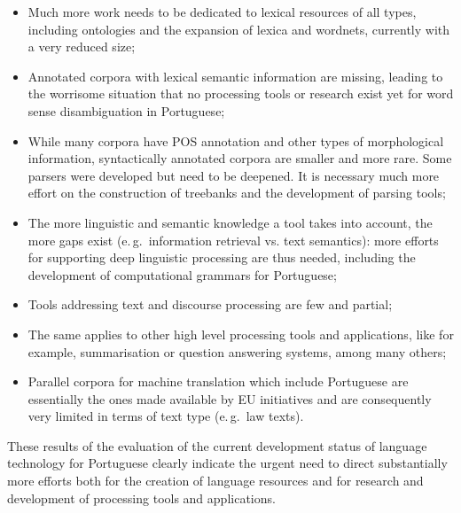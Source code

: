 \begin{multicols}{2}
\begin{itemize}
   \item Much more work needs to be dedicated to lexical resources of all types, including ontologies and the
expansion of lexica and wordnets, currently with a very reduced size;

    \item Annotated corpora with lexical semantic information are missing, leading to the worrisome situation that no processing tools or research exist yet for word sense disambiguation in Portuguese;

    \item While many corpora have POS annotation and other types of morphological information, 
syntactically annotated corpora are smaller and more rare. Some parsers were developed but need to be deepened.
It is necessary much more effort on the construction of treebanks and the development of
parsing tools;

   \item The more linguistic and semantic knowledge a tool takes into account, the more gaps exist (e.\,g.~information retrieval vs. text semantics): more efforts for supporting deep linguistic processing are thus needed, including the development of computational grammars for Portuguese;

   \item Tools addressing text and discourse processing are few and partial;

\item The same applies to other high level processing tools and applications, like for example, 
summarisation or question answering systems, among many others;

    \item Parallel corpora for machine translation which include Portuguese are essentially the ones made available by EU initiatives and are consequently very limited in terms of text type (e.\,g.~law texts).

    \end{itemize}

These results of the evaluation of the current development status of language technology
for Portuguese clearly indicate the urgent need to direct substantially more efforts both for the creation of language resources 
and for research and development of processing tools and applications.



\end{multicols}
